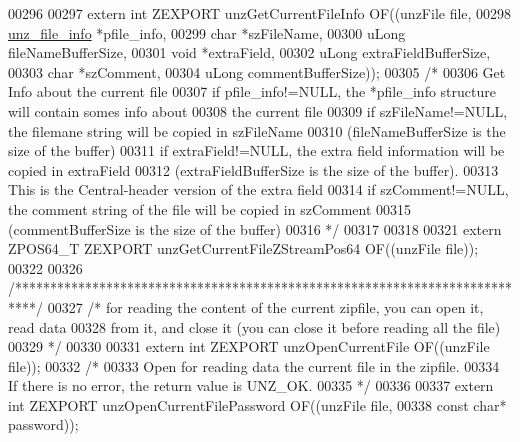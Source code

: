 \begin{DoxyCode}
00296 
00297 \textcolor{keyword}{extern} \textcolor{keywordtype}{int} ZEXPORT unzGetCurrentFileInfo OF((unzFile file,
00298                          \hyperlink{structunz__file__info__s}{unz\_file\_info} *pfile\_info,
00299                          \textcolor{keywordtype}{char} *szFileName,
00300                          uLong fileNameBufferSize,
00301                          \textcolor{keywordtype}{void} *extraField,
00302                          uLong extraFieldBufferSize,
00303                          \textcolor{keywordtype}{char} *szComment,
00304                          uLong commentBufferSize));
00305 \textcolor{comment}{/*}
00306 \textcolor{comment}{  Get Info about the current file}
00307 \textcolor{comment}{  if pfile\_info!=NULL, the *pfile\_info structure will contain somes info about}
00308 \textcolor{comment}{        the current file}
00309 \textcolor{comment}{  if szFileName!=NULL, the filemane string will be copied in szFileName}
00310 \textcolor{comment}{            (fileNameBufferSize is the size of the buffer)}
00311 \textcolor{comment}{  if extraField!=NULL, the extra field information will be copied in extraField}
00312 \textcolor{comment}{            (extraFieldBufferSize is the size of the buffer).}
00313 \textcolor{comment}{            This is the Central-header version of the extra field}
00314 \textcolor{comment}{  if szComment!=NULL, the comment string of the file will be copied in szComment}
00315 \textcolor{comment}{            (commentBufferSize is the size of the buffer)}
00316 \textcolor{comment}{*/}
00317 
00318 
00321 \textcolor{keyword}{extern} ZPOS64\_T ZEXPORT unzGetCurrentFileZStreamPos64 OF((unzFile file));
00322 
00326 \textcolor{comment}{/***************************************************************************/}
00327 \textcolor{comment}{/* for reading the content of the current zipfile, you can open it, read data}
00328 \textcolor{comment}{   from it, and close it (you can close it before reading all the file)}
00329 \textcolor{comment}{   */}
00330 
00331 \textcolor{keyword}{extern} \textcolor{keywordtype}{int} ZEXPORT unzOpenCurrentFile OF((unzFile file));
00332 \textcolor{comment}{/*}
00333 \textcolor{comment}{  Open for reading data the current file in the zipfile.}
00334 \textcolor{comment}{  If there is no error, the return value is UNZ\_OK.}
00335 \textcolor{comment}{*/}
00336 
00337 \textcolor{keyword}{extern} \textcolor{keywordtype}{int} ZEXPORT unzOpenCurrentFilePassword OF((unzFile file,
00338                                                   \textcolor{keyword}{const} \textcolor{keywordtype}{char}* password));

\end{DoxyCode}
